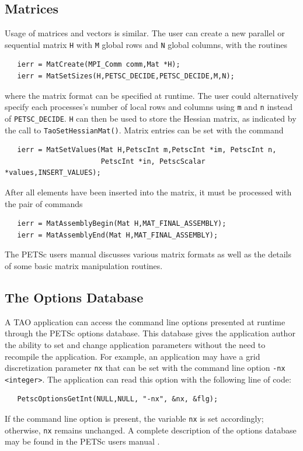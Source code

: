 \documentclass[]{book}
\begin{document}
\subsection*{Matrices}

Usage of matrices and vectors is similar. %
The user can create a new parallel or sequential matrix \texttt{H} with 
\texttt{M} global rows and \texttt{N} global columns, with the routines

\begin{verbatim}
   ierr = MatCreate(MPI_Comm comm,Mat *H);
   ierr = MatSetSizes(H,PETSC_DECIDE,PETSC_DECIDE,M,N);
\end{verbatim}
\noindent
where the matrix format can be specified at runtime.  The user could
alternatively specify each processes's number of local rows and columns
using \texttt{m} and \texttt{n} instead of \texttt{PETSC\_DECIDE}.  
\texttt{H} can then be used to store
the Hessian matrix, as indicated by the call to
\texttt{TaoSetHessianMat()}.  Matrix entries can be set with the
command
\begin{verbatim}
   ierr = MatSetValues(Mat H,PetscInt m,PetscInt *im, PetscInt n,
                       PetscInt *in, PetscScalar *values,INSERT_VALUES);
\end{verbatim}
\noindent
After %
all elements have been inserted into the
matrix, it must be processed with the pair of commands

\begin{verbatim}
   ierr = MatAssemblyBegin(Mat H,MAT_FINAL_ASSEMBLY);
   ierr = MatAssemblyEnd(Mat H,MAT_FINAL_ASSEMBLY);
\end{verbatim}
\noindent
The PETSc users manual \cite{petsc-user-ref} discusses
various matrix formats as
well as the details of some basic matrix manipulation routines.


\subsection*{The Options Database}
\label{sec_options}
A TAO application can access the command line options presented at
runtime through the PETSc options database. This database gives the application
author the ability to set and change application parameters without
the need to recompile the application. For example, 
an application may have a grid discretization parameter \texttt{nx}
that can be set with the command line option \texttt{-nx <integer>}.
The application can read this option with the following line of code:
\begin{verbatim}
   PetscOptionsGetInt(NULL,NULL, "-nx", &nx, &flg);
\end{verbatim}
\noindent
If the command line option is present, the variable \texttt{nx} is set
accordingly; otherwise, \texttt{nx} remains unchanged. A complete
description of the options database may be found in the PETSc users
manual \cite{petsc-user-ref}.
\end{document}

